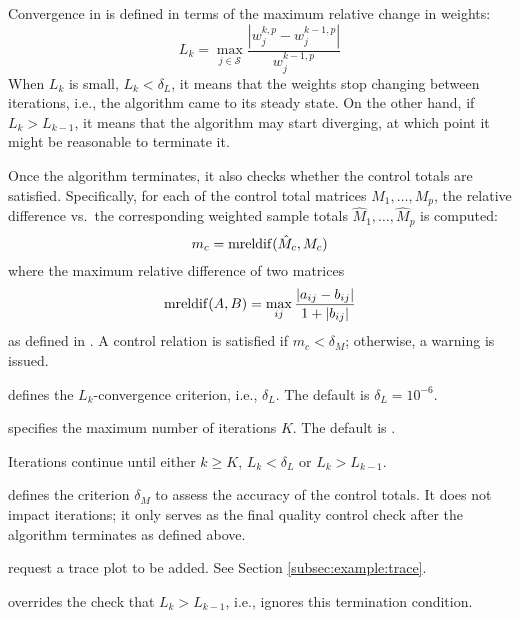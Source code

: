 \begin{sttech}
Convergence in  is defined in terms of the maximum relative
change in weights:
\begin{equation}
    L_k = \max_{j \in \mathcal{S}} \frac{|w_j^{k,p}-w_j^{k-1,p}|}{w_j^{k-1,p}}
    \label{eq:conv:ratio:weights}
\end{equation}
When $L_k$ is small, $L_k < \delta_L$, it means that the weights stop
changing between iterations, i.e., the algorithm came to its steady state.
On the other hand, if $L_k > L_{k-1}$, it means that the algorithm
may start diverging, at which point it might be reasonable to terminate it.

Once the algorithm terminates, it also checks whether the control totals
are satisfied. Specifically, for each of the control total matrices
$M_1, \ldots, M_p$, the relative difference vs.\ the corresponding weighted
sample totals $\hat M_1, \ldots, \hat M_p$ is computed:
\begin{equation}
    m_c = {\rm mreldif}( \hat M_c, M_c )
    \label{eq:conv:mreldif}
\end{equation}
where the maximum relative difference of two matrices
$$
{\rm mreldif}(A,B) = \max_{ij} \frac{|a_{ij}-b_{ij}|}{1+|b_{ij}|}
$$
as defined in . A control relation is satisfied
if $m_c < \delta_M$; otherwise, a warning is issued.

\end{sttech}

\hangpara
{} defines the $L_k$-convergence
criterion, i.e., $\delta_L$. The default is $\delta_L = 10^{-6}$.

\hangpara
{} specifies the maximum number
of iterations $K$.
The default is .

\morehang
Iterations continue until either $k \ge K$, $L_k < \delta_L$ or
$L_k > L_{k-1}$.

\hangpara
{} defines the criterion $\delta_M$ to
assess the accuracy of the control totals. It does not impact
iterations; it only serves as the final quality control check
after the algorithm terminates as defined above.

\hangpara
{} request a trace plot to be added. See
Section \ref{subsec:example:trace}.

\hangpara
{} overrides the check
that $L_k > L_{k-1}$, i.e., ignores this termination condition.

